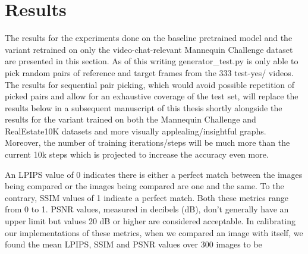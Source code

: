 \section{Results}\label{sec:results} 




The results for the experiments done on the baseline pretrained model and the variant retrained on only the video-chat-relevant Mannequin Challenge dataset are presented in this section. As of this writing generator\_test.py is only able to pick random pairs of reference and target frames from the 333 test-yes/ videos. The results for sequential pair picking, which would avoid possible repetition of picked pairs and allow for an exhaustive coverage of the test set, will replace the results below in a subsequent manuscript of this thesis shortly alongside the results for the variant trained on both the Mannequin Challenge and RealEstate10K datasets and more visually applealing/insightful graphs. Moreover, the number of training iterations/steps will be much more than the current 10k steps which is projected to increase the accuracy even more. 

An LPIPS value of 0 indicates there is either a perfect match between the images being compared or the images being compared are one and the same. To the contrary, SSIM values of 1 indicate a perfect match. Both these metrics range from 0 to 1. PSNR values, measured in decibels (dB), don't generally have an upper limit but values 20 dB or higher are considered acceptable. In calibrating our implementations of these metrics, when we compared an image with itself, we found the mean LPIPS, SSIM and PSNR values over 300 images to be  




